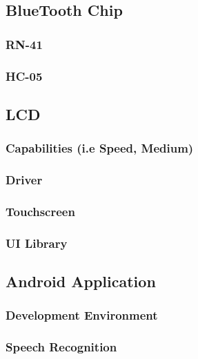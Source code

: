 \subsection{BlueTooth Chip}

\subsubsection{RN-41}

\subsubsection{HC-05}

\subsection{LCD}

\subsubsection{Capabilities (i.e Speed, Medium)}

\subsubsection{Driver}

\subsubsection{Touchscreen}

\subsubsection{UI Library}

\subsection{Android Application}

\subsubsection{Development Environment}

\subsubsection{Speech Recognition}

